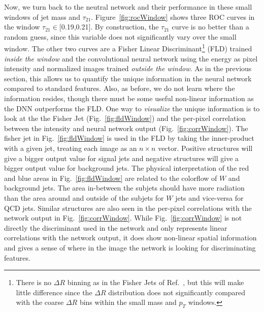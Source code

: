 
Now, we turn back to the neutral network and their performance in these small windows of jet mass and $\tau_{21}$.    Figure~\ref{fig:rocWindow} shows three ROC curves in the window $\tau_{21} \in$[0.19,0.21].  By construction, the $\tau_{21}$ curve is no better than a random guess, since this variable does not significantly vary over the small window.  The other two curves are a Fisher Linear Discriminant\footnote{There is no $\Delta R$ binning as in the Fisher Jets of Ref.~\cite{Cogan:2014oua}, but this will make little difference since the $\Delta R$ distribution does not significantly compared with the coarse $\Delta R$ bins within the small mass and $p_T$ windows.} (FLD) trained {\it inside the window} and the convolutional neural network using the energy as pixel intensity and normalized images trained {\it outside the window}.  As in the previous section, this allows us to quantify the unique information in the neural network compared to standard features.  Also, as before, we do not learn where the information resides, though there must be some useful non-linear information as the DNN outperforms the FLD.  One way to {\it visualize} the unique information is to look at the the Fisher Jet (Fig.~\ref{fig:fldWindow}) and the per-pixel correlation between the intensity and neural network output (Fig.~\ref{fig:corrWindow}).  The fisher jet in Fig.~\ref{fig:fldWindow} is used in the FLD by taking the inner-product with a given jet, treating each image as an $n\times n$ vector.  Positive structures will give a bigger output value for signal jets and negative structures will give a bigger output value for background jets.  The physical interpretation of the red and blue areas in Fig.~\ref{fig:fldWindow} are related to the colorflow of $W$ and background jets.  The area in-between the subjets should have more radiation than the area around and outside of the subjets for $W$ jets and vice-versa for QCD jets.  Similar structures are also seen in the per-pixel correlations with the network output in Fig.~\ref{fig:corrWindow}.  While Fig.~\ref{fig:corrWindow} is not directly the discriminant used in the network and only represents linear correlations with the network output, it does show non-linear spatial information and gives a sense of where in the image the network is looking for discriminating features.

